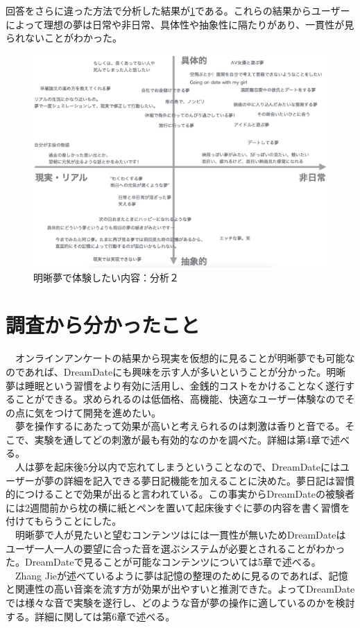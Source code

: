 回答をさらに違った方法で分析した結果が\ref{desiredDreamTpye2}である。これらの結果からユーザーによって理想の夢は日常や非日常、具体性や抽象性に隔たりがあり、一貫性が見られないことがわかった。
\begin{figure}[htbp]
\begin{center}
\includegraphics[width=13cm]{eps/whatYouWantToDream.eps}
\caption{明晰夢で体験したい内容：分析２}
\label{desiredDreamTpye2}
\end{center}
\end{figure}

\section{調査から分かったこと}
　オンラインアンケートの結果から現実を仮想的に見ることが明晰夢でも可能なのであれば、DreamDateにも興味を示す人が多いということが分かった。明晰夢は睡眠という習慣をより有効に活用し、金銭的コストをかけることなく遂行することができる。求められるのは低価格、高機能、快適なユーザー体験なのでその点に気をつけて開発を進めたい。\\
　夢を操作するにあたって効果が高いと考えられるのは刺激は香りと音でる。そこで、実験を通してどの刺激が最も有効的なのかを調べた。詳細は第4章で述べる。\\
　人は夢を起床後5分以内で忘れてしまうということなので、DreamDateにはユーザーが夢の詳細を記入できる夢日記機能を加えることに決めた。夢日記は習慣的につけることで効果が出ると言われている。この事実からDreamDateの被験者には2週間前から枕の横に紙とペンを置いて起床後すぐに夢の内容を書く習慣を付けてもらうことにした。\\
　明晰夢で人が見たいと望むコンテンツはには一貫性が無いためDreamDateはユーザ一人一人の要望に合った音を選ぶシステムが必要とされることがわかった。DreamDateで見ることが可能なコンテンツについては5章で述べる。\\
　Zhang Jieが述べているように夢は記憶の整理のために見るのであれば\cite{Zhang}、記憶と関連性の高い音楽を流す方が効果が出やすいと推測できた。よってDreamDateでは様々な音で実験を遂行し、どのような音が夢の操作に適しているのかを検討する。詳細に関しては第6章で述べる。
　
　